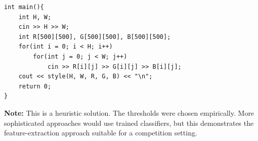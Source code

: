 \documentclass[11pt,a4paper]{article}
\begin{document}
\begin{lstlisting}
int main(){
    int H, W;
    cin >> H >> W;
    int R[500][500], G[500][500], B[500][500];
    for(int i = 0; i < H; i++)
        for(int j = 0; j < W; j++)
            cin >> R[i][j] >> G[i][j] >> B[i][j];
    cout << style(H, W, R, G, B) << "\n";
    return 0;
}
\end{lstlisting}

\textbf{Note:} This is a heuristic solution. The thresholds were chosen empirically. More sophisticated approaches would use trained classifiers, but this demonstrates the feature-extraction approach suitable for a competition setting.
\end{document}
